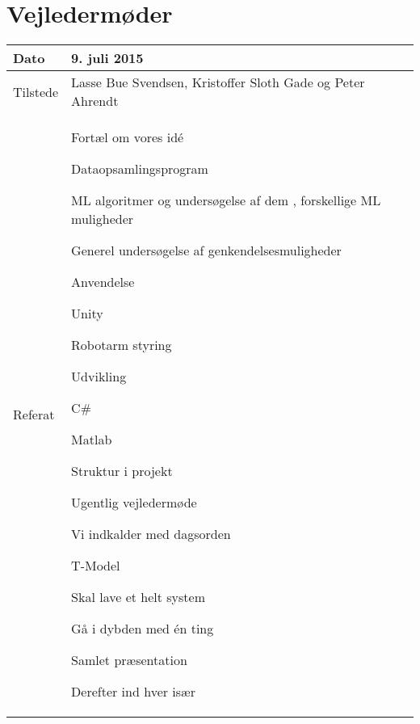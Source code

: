 \chapter{Vejledermøder}
\label{bilag:vejl}
\vspace{-1cm}
\begin{center}
	\begin{tabular}{| l | p{10cm} |}
		\hline
		Dato		& 9. juli 2015\\ \hline
		Tilstede 	& Lasse Bue Svendsen, Kristoffer Sloth Gade og Peter Ahrendt\\ \hline
		Referat		& \vspace{-5mm}\begin{myEnumerate}
			\item Fortæl om vores idé
			\begin{myItemize}				
				\item Dataopsamlingsprogram
				\item ML algoritmer og undersøgelse af dem , forskellige ML muligheder
				\item Generel undersøgelse af genkendelsesmuligheder
				\item Anvendelse
				\begin{myItemize}
					\item Unity
					\item Robotarm styring
				\end{myItemize}
			\end{myItemize}
			\item Udvikling
			\begin{myItemize}
				\item C\#
				\item Matlab
			\end{myItemize}
			\item Struktur i projekt
			\begin{myItemize}
				\item Ugentlig vejledermøde
				\item Vi indkalder med dagsorden
				\item T-Model
				\begin{myItemize}
					\item Skal lave et helt system
					\item Gå i dybden med én ting
				\end{myItemize}
				\item Samlet præsentation
				\begin{myItemize}
					\item Derefter ind hver især

\end{myItemize}
\end{myItemize}
\end{myEnumerate}
\end{tabular}
\end{center}
